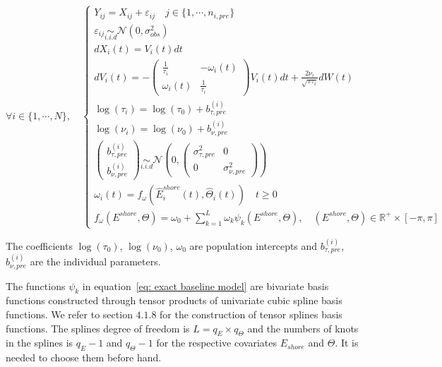\documentclass[11pt]{article}
\newcommand {\R}{\mathbb{R}}
\newcommand {\1}{\mathbb{1}}
\theoremstyle{definition}
\theoremstyle{remark}
\theoremstyle{remark}
\begin{document}
\begin{equation}  \forall i \in \{1,\cdots,N\}, \quad \left\{
	\begin{array}{l}
		Y_{ij}=X_{ij}+\varepsilon_{ij} \quad j \in \{1,\cdots,n_{i,pre}\}\\
		\varepsilon_{ij} \underset{i.i.d}{\sim} \mathcal{N}(0,\sigma_{obs}^2)  \\
		dX_i(t)=V_i(t)dt  \\
		dV_i(t)=-\begin{pmatrix} 
			\frac{1}{\tau_i} & -\omega_i(t) \\
			\omega_i(t) & \frac{1}{\tau_i}
		\end{pmatrix}V_i(t)dt+\frac{2\nu_i}{\sqrt{\pi \tau_i}} dW(t) \\
		\log(\tau_i)=\log(\tau_0)+b_{\tau,pre}^{(i)} \\
		\log(\nu_i)=\log(\nu_0)+b_{\nu,pre}^{(i)}  \\
		\begin{pmatrix} b_{\tau,pre}^{(i)} \\ b_{\nu,pre}^{(i)} \end{pmatrix} \underset{i.i.d}{\sim} \mathcal{N}\left(0,\begin{pmatrix} \sigma_{\tau,pre}^2 & 0 \\ 0 & \sigma_{\nu,pre}^2 \end{pmatrix}\right) \\
		\omega_i(t)=f_{\omega}(\hat{E}^{shore}_i(t),\hat{\Theta}_i(t)) \quad t \geq 0\\
		f_{\omega}(E^{shore},\Theta)=\omega_{0}+\sum_{k=1}^{L} \omega_{k} \psi_k(E^{shore},\Theta), \quad (E^{shore},\Theta) \in \R^+ \times [-\pi,\pi]
	\end{array}
	\right.
	\label{eq: exact baseline model}
\end{equation}



The coefficients $\log(\tau_{0})$, $\log(\nu_{0})$, $\omega_{0}$ are population intercepts and $b^{(i)}_{\tau,pre}$, $b^{(i)}_{\nu,pre}$
are the individual parameters. 

The functions $\psi_k$ in equation~\ref{eq: exact baseline model} are bivariate basis functions constructed through tensor products of univariate cubic spline basis functions. We refer to \cite{wood_generalized_2017} section $4.
1.8$ for the construction of tensor splines basis functions. The splines degree of freedom is $L=q_E \times q_{\Theta}$ and the numbers of knots in the splines is $q_E-1$ and $q_{\Theta}-1$ for the respective covariates $E_{shore}$ and $\Theta$. It is needed to choose them before hand.\\
\end{document}
